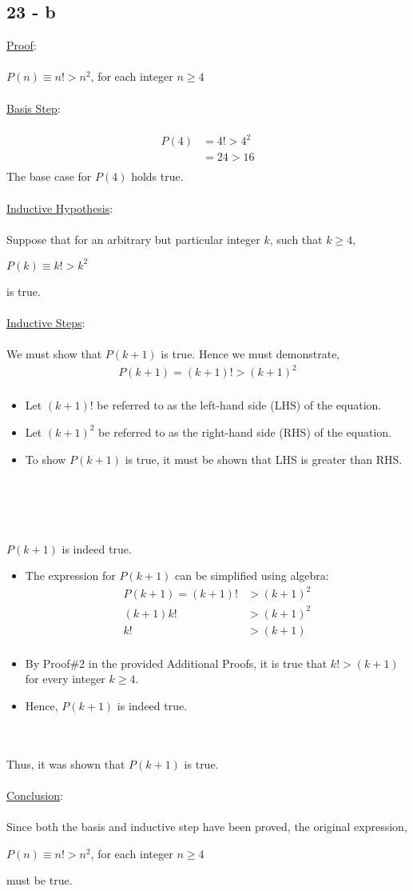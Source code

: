 \documentclass[12pt]{article}
\newcommand{\xlist}[1]{
    \begin{itemize}
        \renewcommand{\labelitemi}{$\centerdot$}
        #1
    \end{itemize}
    \newblock
    \\ \\
}
\newcommand{\xconclusion}[1]{
    \underline{Conclusion}:
    \\ \\
    #1
    \\ \\
}
\newcommand{\xproof}[1]{
    \underline{Proof}:
    \\ \\
    #1
    \\ \\
}
\newcommand{\xbasisstep}{
    \underline{Basis Step}:
    \\ \\
}
\newcommand{\xinductivehypothesis}{
    \underline{Inductive Hypothesis}:
    \\ \\
}
\newcommand{\xinductivestep}{
    \underline{Inductive Steps}:
    \\ \\
}
\begin{document}
\subsection*{23 - b}
\xproof{$P(n) \equiv n! > n^2$, for each integer $n\geq4$}
\xbasisstep
\begin{align*}
  P(4) &= 4! > 4^2 \\
  &= 24 > 16 \\
\end{align*}
The base case for $P(4)$ holds true.
\\ \\
\xinductivehypothesis
Suppose that for an arbitrary but particular integer $k$, such that $k \geq 4$,
\begin{center}
  $P(k) \equiv k! > k^2$
\end{center}
is true. \\ \\
\xinductivestep
We must show that $P(k+1)$ is true. Hence we must demonstrate,
\begin{align*}
  P(k+1) = (k+1)! > (k+1)^2 \\
\end{align*}
\xlist{
  \item Let $(k+1)!$ be referred to as the left-hand side (LHS) of the equation.
  \item Let $(k+1)^2$ be referred to as the right-hand side (RHS) of the equation.
  \item To show $P(k+1)$ is true, it must be shown that LHS is greater than RHS.
}
\\ \\
$P(k+1)$ is indeed true.
\xlist{
  \item The expression for $P(k+1)$ can be simplified using algebra:
  \begin{align*}
    P(k+1) = (k+1)! &> (k+1)^2 \\
    (k+1)k! &> (k+1)^2 \\
    k! &> (k+1) \\
  \end{align*}
  \item By Proof\#2 in the provided Additional Proofs, it is true that $k! > (k+1)$ for every integer $k \geq 4$. 
  \item Hence, $P(k+1)$ is indeed true.
}
Thus, it was shown that $P(k+1)$ is true.
\\ \\
\xconclusion{
  Since both the basis and inductive step have been proved, the original expression,
  \begin{center}
    $P(n) \equiv n! > n^2$, for each integer $n \geq 4$
  \end{center}
  must be true.}
\end{document}
